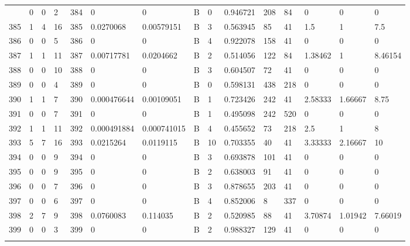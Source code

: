 \begin{latin}
\begin{longtable}{lllllllllllllll}
\begin{comment}
	384 & 0  & 0   & 2  & 384 & 0              & 0              & B & 0  & 0.946721 & 208  & 84   & 0       & 0       & 0       \\
	385 & 1  & 4   & 16 & 385 & 0.0270068      & 0.00579151     & B & 3  & 0.563945 & 85   & 41   & 1.5     & 1       & 7.5     \\
	386 & 0  & 0   & 5  & 386 & 0              & 0              & B & 4  & 0.922078 & 158  & 41   & 0       & 0       & 0       \\
	387 & 1  & 1   & 11 & 387 & 0.00717781     & 0.0204662      & B & 2  & 0.514056 & 122  & 84   & 1.38462 & 1       & 8.46154 \\
	388 & 0  & 0   & 10 & 388 & 0              & 0              & B & 3  & 0.604507 & 72   & 41   & 0       & 0       & 0       \\
	389 & 0  & 0   & 4  & 389 & 0              & 0              & B & 0  & 0.598131 & 438  & 218  & 0       & 0       & 0       \\
	390 & 1  & 1   & 7  & 390 & 0.000476644    & 0.00109051     & B & 1  & 0.723426 & 242  & 41   & 2.58333 & 1.66667 & 8.75    \\
	391 & 0  & 0   & 7  & 391 & 0              & 0              & B & 1  & 0.495098 & 242  & 520  & 0       & 0       & 0       \\
	392 & 1  & 1   & 11 & 392 & 0.000491884    & 0.000741015    & B & 4  & 0.455652 & 73   & 218  & 2.5     & 1       & 8       \\
	393 & 5  & 7   & 16 & 393 & 0.0215264      & 0.0119115      & B & 10 & 0.703355 & 40   & 41   & 3.33333 & 2.16667 & 10      \\
	394 & 0  & 0   & 9  & 394 & 0              & 0              & B & 3  & 0.693878 & 101  & 41   & 0       & 0       & 0       \\
	395 & 0  & 0   & 9  & 395 & 0              & 0              & B & 2  & 0.638003 & 91   & 41   & 0       & 0       & 0       \\
	396 & 0  & 0   & 7  & 396 & 0              & 0              & B & 3  & 0.878655 & 203  & 41   & 0       & 0       & 0       \\
	397 & 0  & 0   & 6  & 397 & 0              & 0              & B & 4  & 0.852006 & 8    & 337  & 0       & 0       & 0       \\
	398 & 2  & 7   & 9  & 398 & 0.0760083      & 0.114035       & B & 2  & 0.520985 & 88   & 41   & 3.70874 & 1.01942 & 7.66019 \\
	399 & 0  & 0   & 3  & 399 & 0              & 0              & B & 2  & 0.988327 & 129  & 41   & 0       & 0       & 0       \\

\end{comment}
\end{longtable}
\end{latin}
